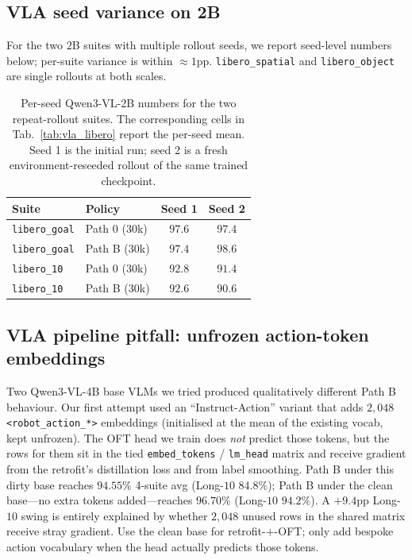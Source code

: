 \documentclass{article}
\begin{document}
\subsection{VLA seed variance on 2B}
\label{app:vla_variance}
For the two $2$B suites with multiple rollout seeds, we report seed-level numbers below; per-suite variance is within $\approx 1$pp. \texttt{libero\_spatial} and \texttt{libero\_object} are single rollouts at both scales.
\begin{table}[h]
\caption{Per-seed Qwen3-VL-2B numbers for the two repeat-rollout suites. The corresponding cells in Tab.~\ref{tab:vla_libero} report the per-seed mean. Seed 1 is the initial run; seed 2 is a fresh environment-reseeded rollout of the same trained checkpoint.}
\label{tab:vla_seed_variance}
\centering\small
\begin{tabular}{llcc}
\toprule
Suite & Policy & Seed 1 & Seed 2 \\
\midrule
\texttt{libero\_goal} & Path 0 ($30$k) & $97.6$ & $97.4$ \\
\texttt{libero\_goal} & Path B ($30$k) & $97.4$ & $98.6$ \\
\texttt{libero\_10}   & Path 0 ($30$k) & $92.8$ & $91.4$ \\
\texttt{libero\_10}   & Path B ($30$k) & $92.6$ & $90.6$ \\
\bottomrule
\end{tabular}
\end{table}

\subsection{VLA pipeline pitfall: unfrozen action-token embeddings}
\label{app:vla_pitfall}
Two Qwen3-VL-4B base VLMs we tried produced qualitatively different Path B behaviour. Our first attempt used an ``Instruct-Action'' variant that adds $2{,}048$ \texttt{<robot\_action\_*>} embeddings (initialised at the mean of the existing vocab, kept unfrozen). The OFT head we train does \emph{not} predict those tokens, but the rows for them sit in the tied \texttt{embed\_tokens} / \texttt{lm\_head} matrix and receive gradient from the retrofit's distillation loss and from label smoothing. Path B under this dirty base reaches $94.55\%$ 4-suite avg (Long-$10$ $84.8\%$); Path B under the clean base---no extra tokens added---reaches $96.70\%$ (Long-$10$ $94.2\%$). A $+9.4$pp Long-$10$ swing is entirely explained by whether $2{,}048$ unused rows in the shared matrix receive stray gradient. Use the clean base for retrofit-$+$-OFT; only add bespoke action vocabulary when the head actually predicts those tokens.
\end{document}
